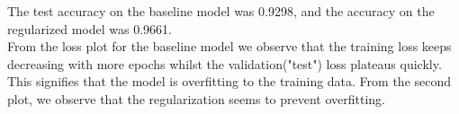 \begin{answer}
The test accuracy on the baseline model was 0.9298, and the accuracy on the regularized model was 0.9661. 
\\
From the loss plot for the baseline model we observe that the training loss keeps decreasing with more epochs whilst the validation("test") loss plateaus quickly. This signifies that the model is overfitting to the training data. From the second plot, we observe that the regularization seems to prevent overfitting.
\end{answer}
   
  
